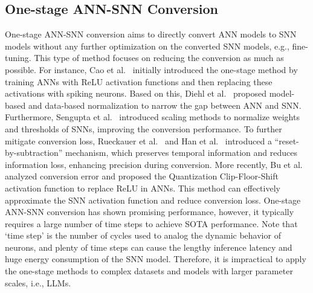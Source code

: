 \subsection{One-stage ANN-SNN Conversion} 
One-stage ANN-SNN conversion aims to directly convert ANN models to SNN models without any further optimization on the converted SNN models, e.g., fine-tuning. This type of method focuses on reducing the conversion as much as possible. For instance, Cao et al.~\cite{cao2015spiking} initially introduced the one-stage method by training ANNs with ReLU activation functions and then replacing these activations with spiking neurons. Based on this, Diehl et al.~\cite{Diehl2015FastclassifyingHS} proposed model-based and data-based normalization to narrow the gap between ANN and SNN. Furthermore, Sengupta et al.~\cite{Sengupta2018GoingDI} introduced scaling methods to normalize weights and thresholds of SNNs, improving the conversion performance. To further mitigate conversion loss, Rueckauer et al.~\cite{rueckauer2016theory} and Han et al.~\cite{han2020deep} introduced a ``reset-by-subtraction'' mechanism, which preserves temporal information and reduces information loss, enhancing precision during conversion. More recently, Bu et al.~\cite{Bu2022OptimizedPI} analyzed conversion error and proposed the Quantization Clip-Floor-Shift activation function to replace ReLU in ANNs. This method can effectively approximate the SNN activation function and reduce conversion loss. One-stage ANN-SNN conversion has shown promising performance, however, it typically requires a large number of time steps to achieve SOTA performance. Note that `time step' is the number of cycles used to analog the dynamic behavior of neurons, and plenty of time steps can cause the lengthy inference latency and huge energy consumption of the SNN model. Therefore, it is impractical to apply the one-stage methods to complex datasets and models with larger parameter scales, i.e., LLMs.



